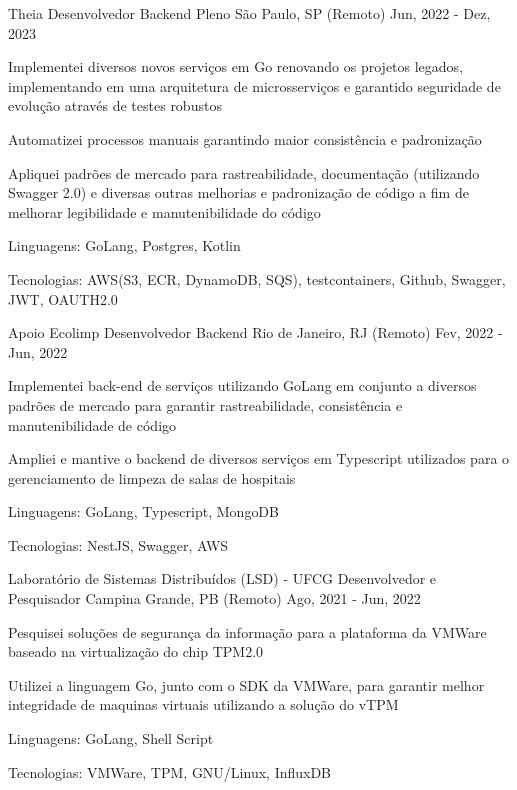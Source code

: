 
\begin{cventries}
  \cventry
  {Theia} %
  {Desenvolvedor Backend Pleno} %
  {São Paulo, SP (Remoto)} %
  {Jun, 2022 - Dez, 2023} %
  {
    \begin{cvitems} %
      \item {Implementei diversos novos serviços em Go renovando os projetos legados, implementando em uma arquitetura de microsserviços e garantido seguridade de evolução através de testes robustos}
      \item {Automatizei processos manuais garantindo maior consistência e padronização}
      \item {Apliquei padrões de mercado para rastreabilidade, documentação (utilizando Swagger 2.0) e diversas outras melhorias e padronização de código a fim de melhorar legibilidade e manutenibilidade do código}
      \item {Linguagens: GoLang, Postgres, Kotlin}
      \item {Tecnologias: AWS(S3, ECR, DynamoDB, SQS), testcontainers, Github, Swagger, JWT, OAUTH2.0}
    \end{cvitems}
  }

  \cventry
  {Apoio Ecolimp} %
  {Desenvolvedor Backend} %
  {Rio de Janeiro, RJ (Remoto)} %
  {Fev, 2022 - Jun, 2022} %
  {
    \begin{cvitems} %
      \item {Implementei back-end de serviços utilizando GoLang em conjunto a diversos padrões de mercado para garantir rastreabilidade, consistência e manutenibilidade de código}
      \item {Ampliei e mantive o backend de diversos serviços em Typescript utilizados para o gerenciamento de limpeza de salas de hospitais}
      \item {Linguagens: GoLang, Typescript, MongoDB}
      \item {Tecnologias: NestJS, Swagger, AWS}
    \end{cvitems}
  }

  \cventry
  {Laboratório de Sistemas Distribuídos (LSD) - UFCG} %
  {Desenvolvedor e Pesquisador} %
  {Campina Grande, PB (Remoto)} %
  {Ago, 2021 - Jun, 2022} %
  {
    \begin{cvitems} %
      \item {Pesquisei soluções de segurança da informação para a plataforma da VMWare baseado na virtualização do chip TPM2.0}
      \item {Utilizei a linguagem Go, junto com o SDK da VMWare, para garantir melhor integridade de maquinas virtuais utilizando a solução do vTPM}
      \item {Linguagens: GoLang, Shell Script}
      \item {Tecnologias: VMWare, TPM, GNU/Linux, InfluxDB}
    \end{cvitems}
  }


\end{cventries}
